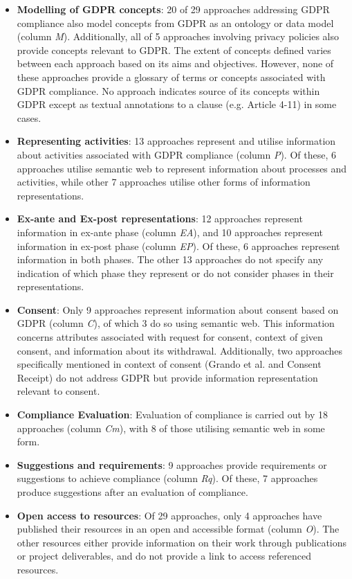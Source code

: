 \begin{itemize}
    \item \textbf{Modelling of GDPR concepts}: 20 of 29 approaches addressing GDPR compliance also model concepts from GDPR as an ontology or data model (column \textit{M}). Additionally, all of 5 approaches involving privacy policies also provide concepts relevant to GDPR. The extent of concepts defined varies between each approach based on its aims and objectives. However, none of these approaches provide a glossary of terms or concepts associated with GDPR compliance. No approach indicates source of its concepts within GDPR except as textual annotations to a clause (e.g. Article 4-11) in some cases.
    
    \item \textbf{Representing activities}: 13 approaches represent and utilise information about activities associated with GDPR compliance (column \textit{P}). Of these, 6 approaches utilise semantic web to represent information about processes and activities, while other 7 approaches utilise other forms of information representations.
    
    \item \textbf{Ex-ante and Ex-post representations}: 12 approaches represent information in ex-ante phase (column \textit{EA}), and 10 approaches represent information in ex-post phase (column \textit{EP}). Of these, 6 approaches represent information in both phases. The other 13 approaches do not specify any indication of which phase they represent or do not consider phases in their representations.
    
    \item \textbf{Consent}: Only 9 approaches represent information about consent based on GDPR (column \textit{C}), of which 3 do so using semantic web. This information concerns attributes associated with request for consent, context of given consent, and information about its withdrawal. Additionally, two approaches specifically mentioned in context of consent (Grando et al. and Consent Receipt) do not address GDPR but provide information representation relevant to consent.
    
    \item \textbf{Compliance Evaluation}: Evaluation of compliance is carried out by 18 approaches (column \textit{Cm}), with 8 of those utilising semantic web in some form. 
    
    \item \textbf{Suggestions and requirements}: 9 approaches provide requirements or suggestions to achieve compliance (column \textit{Rq}). Of these, 7 approaches produce suggestions after an evaluation of compliance.
    
    \item \textbf{Open access to resources}: Of 29 approaches, only 4 approaches have published their resources in an open and accessible format (column \textit{O}). The other resources either provide information on their work through publications or project deliverables, and do not provide a link to access referenced resources.
\end{itemize}

